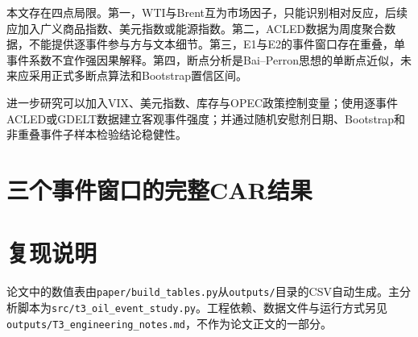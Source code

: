 \documentclass[UTF8,zihao=-4,a4paper]{ctexart}
\begin{document}
本文存在四点局限。第一，WTI与Brent互为市场因子，只能识别相对反应，后续应加入广义商品指数、美元指数或能源指数。第二，ACLED数据为周度聚合数据，不能提供逐事件参与方与文本细节。第三，E1与E2的事件窗口存在重叠，单事件系数不宜作强因果解释。第四，断点分析是Bai--Perron思想的单断点近似，未来应采用正式多断点算法和Bootstrap置信区间。

进一步研究可以加入VIX、美元指数、库存与OPEC政策控制变量；使用逐事件ACLED或GDELT数据建立客观事件强度；并通过随机安慰剂日期、Bootstrap和非重叠事件子样本检验结论稳健性。

\printbibliography[title={参考文献}]

\appendix
\section{三个事件窗口的完整CAR结果}

\begin{table}[H]
  \centering
  \caption{全部事件窗口CAR、$t$值与原始$p$值}
  \label{tab:car-all}
  \scriptsize
  \resizebox{\textwidth}{!}{}
\end{table}

\section{复现说明}

论文中的数值表由\texttt{paper/build\_tables.py}从\texttt{outputs/}目录的CSV自动生成。主分析脚本为\texttt{src/t3\_oil\_event\_study.py}。工程依赖、数据文件与运行方式另见\texttt{outputs/T3\_engineering\_notes.md}，不作为论文正文的一部分。
\end{document}
